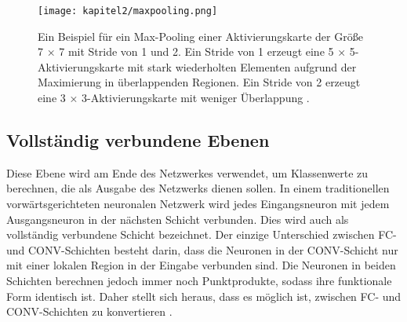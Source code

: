 \begin{figure}[H]
  \centering
  \texttt{[image: kapitel2/maxpooling.png]}
  \caption[Max-Pooling]{Ein Beispiel für ein Max-Pooling einer Aktivierungskarte der Größe 7 × 7 mit Stride von 1 und 2. Ein Stride von 1 erzeugt eine 5 × 5-Aktivierungskarte mit stark wiederholten Elementen aufgrund der Maximierung in überlappenden Regionen. Ein Stride von 2 erzeugt eine 3 × 3-Aktivierungskarte mit weniger Überlappung \cite*[326]{Aggarwal2018}.}
  \label{Kap2:Pooling}
\end{figure}


\subsection{Vollständig verbundene Ebenen}
Diese Ebene wird am Ende des Netzwerkes verwendet, um Klassenwerte zu berechnen, die als Ausgabe des Netzwerks dienen sollen. In einem traditionellen vorwärtsgerichteten neuronalen Netzwerk wird jedes Eingangsneuron mit jedem Ausgangsneuron in der nächsten Schicht verbunden. Dies wird auch als vollständig verbundene Schicht bezeichnet. Der einzige Unterschied zwischen FC- und CONV-Schichten besteht darin, dass die Neuronen in der CONV-Schicht nur mit einer lokalen Region in der Eingabe verbunden sind. Die Neuronen in beiden Schichten berechnen jedoch immer noch Punktprodukte, sodass ihre funktionale Form identisch ist. Daher stellt sich heraus, dass es möglich ist, zwischen FC- und CONV-Schichten zu konvertieren \cite*{StanfordUniversityCoursecs231n2018a}.



